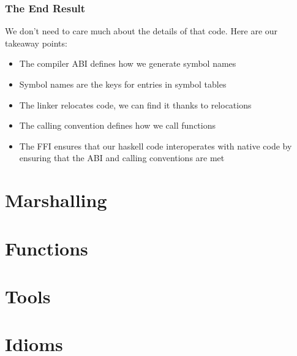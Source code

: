 \documentclass{beamer}
\begin{document}
\begin{frame}
    \frametitle{The End Result}

    We don't need to care much about the details of that code.  Here are our
    takeaway points:

    \begin{itemize}
        \item{The compiler ABI defines how we generate symbol names}
        \item{Symbol names are the keys for entries in symbol tables}
        \item{The linker relocates code, we can find it thanks to relocations}
        \item{The calling convention defines how we call functions}
        \item{The FFI ensures that our haskell code interoperates with native
              code by ensuring that the ABI and calling conventions are met}
    \end{itemize}

\end{frame}

\section{Marshalling}

\section{Functions}

\section{Tools}

\section{Idioms}

\begin{frame}
\end{frame}
\end{document}
